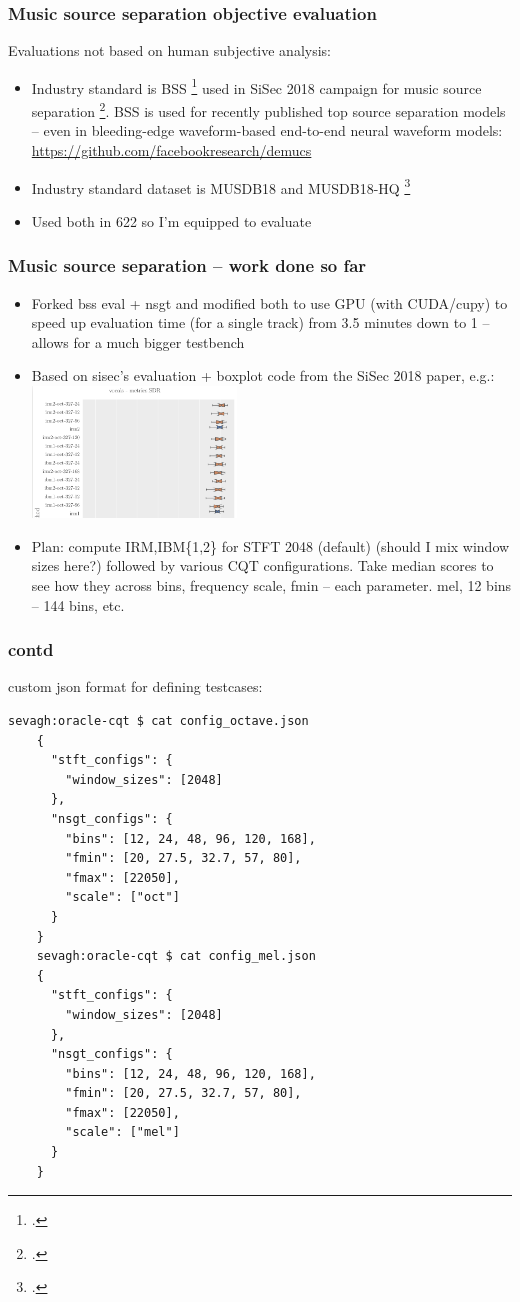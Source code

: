 \documentclass[usenames,dvipsnames]{beamer}
\begin{document}
\begin{frame}
	\frametitle{Music source separation objective evaluation}
	Evaluations not based on human subjective analysis:
	\begin{itemize}
		\item
			Industry standard is BSS \footcite{bss} used in SiSec 2018 campaign for music source separation \footcite{sigsep2018}. BSS is used for recently published top source separation models -- even in bleeding-edge waveform-based end-to-end neural waveform models: \href{https://github.com/facebookresearch/demucs}{https://github.com/facebookresearch/demucs}
		\item
			Industry standard dataset is MUSDB18 and MUSDB18-HQ \footcite{musdb18, musdb18-hq}
		\item
			Used both in 622 so I'm equipped to evaluate
	\end{itemize}
\end{frame}

\begin{frame}
	\frametitle{Music source separation -- work done so far}
	\begin{itemize}
		\item
			Forked bss eval + nsgt and modified both to use GPU (with CUDA/cupy) to speed up evaluation time (for a single track) from 3.5 minutes down to 1 -- allows for a much bigger testbench
		\item
			Based on sisec's evaluation + boxplot code from the SiSec 2018 paper, e.g.:\\
			\includegraphics[height=3.5cm]{./irm_boxplot_example.png}
		\item
			Plan: compute IRM,IBM\{1,2\} for STFT 2048 (default) (should I mix window sizes here?) followed by various CQT configurations. Take median scores to see how they across bins, frequency scale, fmin -- each parameter. mel, 12 bins -- 144 bins, etc.
	\end{itemize}
\end{frame}

\begin{frame}[fragile]
	\frametitle{contd}
	custom json format for defining testcases:
	\begin{Verbatim}[fontsize=\tiny]
	sevagh:oracle-cqt $ cat config_octave.json
	{
	  "stft_configs": {
	    "window_sizes": [2048]
	  },
	  "nsgt_configs": {
	    "bins": [12, 24, 48, 96, 120, 168],
	    "fmin": [20, 27.5, 32.7, 57, 80],
	    "fmax": [22050],
	    "scale": ["oct"]
	  }
	}
	sevagh:oracle-cqt $ cat config_mel.json
	{
	  "stft_configs": {
	    "window_sizes": [2048]
	  },
	  "nsgt_configs": {
	    "bins": [12, 24, 48, 96, 120, 168],
	    "fmin": [20, 27.5, 32.7, 57, 80],
	    "fmax": [22050],
	    "scale": ["mel"]
	  }
	}
	\end{Verbatim}
\end{frame}
\end{document}
